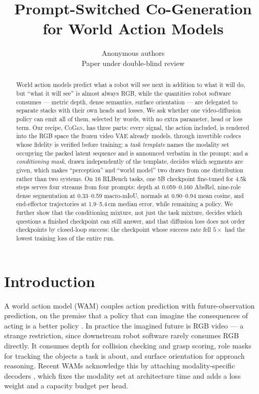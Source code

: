 \documentclass{article} %
\title{Prompt-Switched Co-Generation for World Action Models}
\author{Anonymous authors\\Paper under double-blind review}
\newcommand{\method}{\textsc{CoGen}}
\begin{document}
\maketitle

\begin{abstract}
World action models predict what a robot will see next in addition to what it will do, but
``what it will see'' is almost always RGB, while the quantities robot software consumes ---
metric depth, dense semantics, surface orientation --- are delegated to separate stacks with
their own heads and losses. We ask whether one video-diffusion policy can emit all of them,
selected by words, with no extra parameter, head or loss term. Our recipe, \method, has three
parts: every signal, the action included, is rendered into the RGB space the frozen video VAE
already models, through invertible codecs whose fidelity is verified before training; a
\emph{task template} names the modality set occupying the packed latent sequence and is
announced verbatim in the prompt; and a \emph{conditioning mask}, drawn independently of the
template, decides which segments are given, which makes ``perception'' and ``world model'' two
draws from one distribution rather than two systems. On 16 RLBench tasks, one 5B checkpoint
fine-tuned for 4.5k steps serves four streams from four prompts: depth at 0.059--0.160 AbsRel,
nine-role dense segmentation at 0.33--0.59 macro-mIoU, normals at 0.90--0.94 mean cosine, and
end-effector trajectories at 1.9--5.4\,cm median error, while remaining a policy. We further
show that the conditioning mixture, not just the task mixture, decides which questions a
finished checkpoint can still answer, and that diffusion loss does not order checkpoints by
closed-loop success: the checkpoint whose success rate fell $5\times$ had the lowest training
loss of the entire run.
\end{abstract}

\section{Introduction}

A world action model (WAM) couples action prediction with future-observation prediction, on the
premise that a policy that can imagine the consequences of acting is a better policy
\citep{zhu2025unified,zhen2026action}. In practice the imagined future is RGB video --- a strange
restriction, since downstream robot software rarely consumes RGB directly. It consumes depth for
collision checking and grasp scoring, role masks for tracking the objects a task is about, and
surface orientation for approach reasoning. Recent WAMs acknowledge this by attaching
modality-specific decoders \citep{ma2026geosem,yuan2026dreamwam,zhao2026rynnworld}, which fixes the
modality set at architecture time and adds a loss weight and a capacity budget per head.
\end{document}
